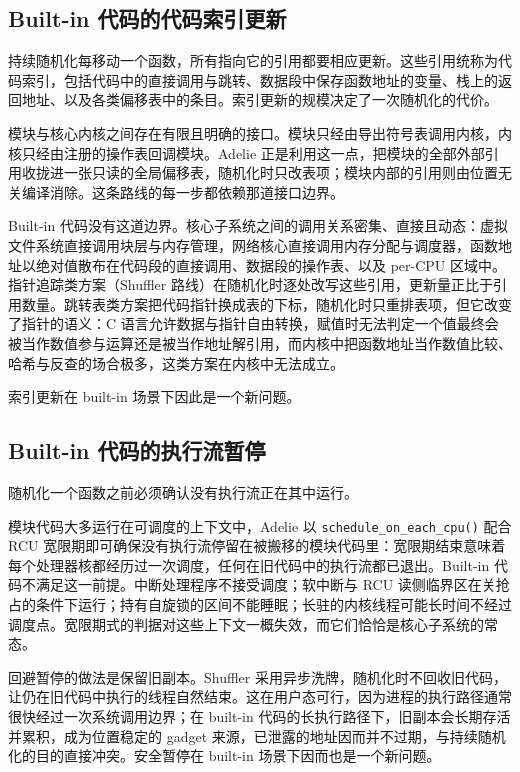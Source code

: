 \subsection{Built-in 代码的代码索引更新}

持续随机化每移动一个函数，所有指向它的引用都要相应更新。这些引用统称为代码索引，包括代码中的直接调用与跳转、数据段中保存函数地址的变量、栈上的返回地址、以及各类偏移表中的条目。索引更新的规模决定了一次随机化的代价。

模块与核心内核之间存在有限且明确的接口。模块只经由导出符号表调用内核，内核只经由注册的操作表回调模块。Adelie\citep{nikolaev2022adelie} 正是利用这一点，把模块的全部外部引用收拢进一张只读的全局偏移表，随机化时只改表项；模块内部的引用则由位置无关编译消除。这条路线的每一步都依赖那道接口边界。

Built-in 代码没有这道边界。核心子系统之间的调用关系密集、直接且动态：虚拟文件系统直接调用块层与内存管理，网络核心直接调用内存分配与调度器，函数地址以绝对值散布在代码段的直接调用、数据段的操作表、以及 per-CPU 区域中。指针追踪类方案（Shuffler\citep{williams2016shuffler} 路线）在随机化时逐处改写这些引用，更新量正比于引用数量。跳转表类方案把代码指针换成表的下标，随机化时只重排表项，但它改变了指针的语义：C 语言允许数据与指针自由转换，赋值时无法判定一个值最终会被当作数值参与运算还是被当作地址解引用，而内核中把函数地址当作数值比较、哈希与反查的场合极多，这类方案在内核中无法成立。

索引更新在 built-in 场景下因此是一个新问题。

\subsection{Built-in 代码的执行流暂停}

随机化一个函数之前必须确认没有执行流正在其中运行。

模块代码大多运行在可调度的上下文中，Adelie 以 \lstinline[breaklines=false]@schedule_on_each_cpu()@ 配合 RCU 宽限期即可确保没有执行流停留在被搬移的模块代码里：宽限期结束意味着每个处理器核都经历过一次调度，任何在旧代码中的执行流都已退出。Built-in 代码不满足这一前提。中断处理程序不接受调度；软中断与 RCU 读侧临界区在关抢占的条件下运行；持有自旋锁的区间不能睡眠；长驻的内核线程可能长时间不经过调度点。宽限期式的判据对这些上下文一概失效，而它们恰恰是核心子系统的常态。

回避暂停的做法是保留旧副本。Shuffler 采用异步洗牌，随机化时不回收旧代码，让仍在旧代码中执行的线程自然结束。这在用户态可行，因为进程的执行路径通常很快经过一次系统调用边界；在 built-in 代码的长执行路径下，旧副本会长期存活并累积，成为位置稳定的 gadget 来源，已泄露的地址因而并不过期，与持续随机化的目的直接冲突。安全暂停在 built-in 场景下因而也是一个新问题。

